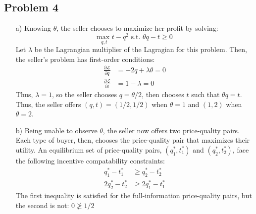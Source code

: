 \documentclass{article}
\newcommand{\usmax}[1]{\underset{#1}{\text{max }}}
\renewcommand{\L}{\mathcal{L}}
\begin{document}
\subsection*{Problem 4}

\begin{itemize}
	\item[a)] Knowing $\theta$, the seller chooses to maximize her profit by solving:
		\[
			\usmax{q,t}t-q^2\text{ s.t. }\theta q - t\geq 0
		\]
		Let $\lambda$ be the Lagrangian multiplier of the Lagragian for this problem. Then, the seller's problem has first-order conditions:
		\begin{align*}
			\frac{\partial\L}{\partial q} &= -2q + \lambda\theta = 0	\\
			\frac{\partial\L}{\partial t} &= 1 - \lambda = 0
		\end{align*}
		Thus, $\lambda=1$, so the seller chooses ${q=\theta/2}$, then chooses $t$ such that ${\theta q=t}$. Thus, the seller offers ${(q,t)=(1/2,1/2)}$ when ${\theta=1}$ and ${(1,2)}$ when ${\theta=2}$.
	
	\item[b)] Being unable to observe $\theta$, the seller now offers two price-quality pairs. Each type of buyer, then, chooses the price-quality pair that maximizes their utility. An equilibrium set of price-quality pairs, ${(q^*_1,t^*_1)}$ and ${(q^*_2,t^*_2)}$, face the following incentive compatability constraints:
		\begin{align*}
			q_1^* - t_1^* 	&\geq q_2^* - t_2^*		\\
			2q_2^* - t_2^* 	&\geq 2q_1^* - t_1^*
		\end{align*}
		The first inequality is satisfied for the full-information price-quality pairs, but the second is not: ${0\ngeq 1/2}$
	

\end{itemize}
\end{document}
